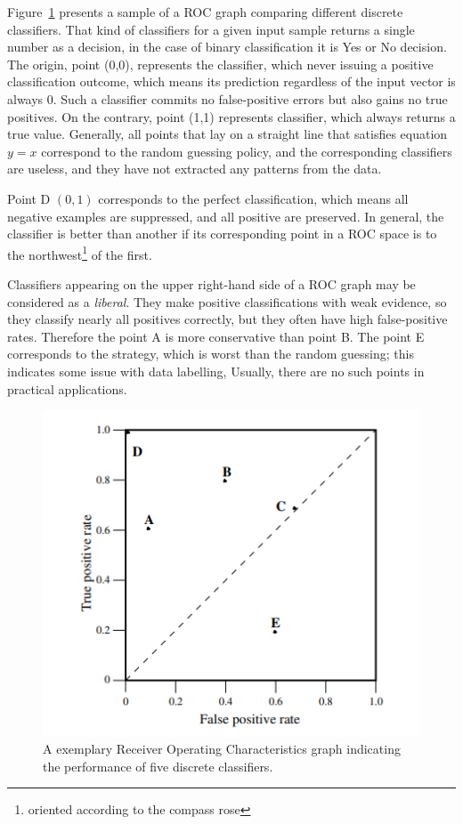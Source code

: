 Figure~\ref{fig:ROC_eg} presents a sample of a ROC graph comparing different discrete classifiers. That kind of classifiers for a given input sample returns a single number as a decision, in the case of binary classification it is Yes or No decision. The origin, point (0,0), represents the classifier, which never issuing a positive classification outcome, which means its prediction regardless of the input vector is always 0. Such a classifier commits no false-positive errors but also gains no true positives. On the contrary, point (1,1) represents classifier, which always returns a true value. Generally, all points that lay on a straight line that satisfies equation $y=x$ correspond to the random guessing policy, and the corresponding classifiers are useless, and they have not extracted any patterns from the data.  

Point D $(0,1)$ corresponds to the perfect classification, which means all negative examples are suppressed, and all positive are preserved. In general, the classifier is better than another if its corresponding point in a ROC space is to the northwest\footnote{oriented according to the compass rose} of the first. 
% 

Classifiers appearing on the upper right-hand side of a ROC graph may be considered as a \textit{liberal}. They make positive classifications with weak evidence, so they classify nearly all positives correctly, but they often have high false-positive rates. Therefore the point A is more conservative than point B. The point E corresponds to the strategy, which is worst than the random guessing; this indicates some issue with data labelling, Usually, there are no such points in practical applications. 

\begin{figure}[!ht]
\centering
\includegraphics[scale=0.7]{figures/ExampleROC.PNG}
\caption{A exemplary Receiver Operating Characteristics graph indicating the performance of five discrete classifiers.
\label{fig:ROC_eg}}
\end{figure}

